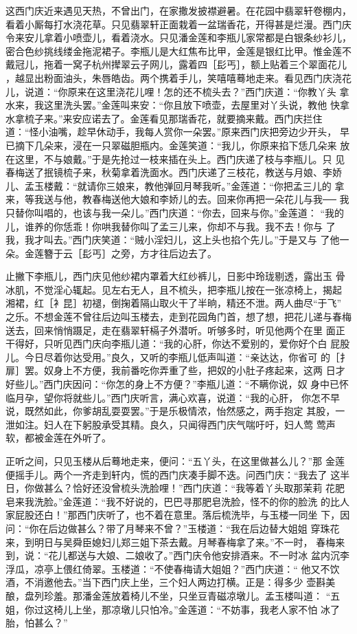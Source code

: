 这西门庆近来遇见天热，不曾出门，在家撒发披襟避暑。在花园中翡翠轩卷棚内，
看着小厮每打水浇花草。只见翡翠轩正面栽着一盆瑞香花，开得甚是烂漫。西门庆
令来安儿拿着小喷壶儿，看着浇水。只见潘金莲和李瓶儿家常都是白银条纱衫儿，
密合色纱挑线缕金拖泥裙子。李瓶儿是大红焦布比甲，金莲是银红比甲。惟金莲不
戴冠儿，拖着一窝子杭州撵翠云子网儿，露着四［髟丐］，额上贴着三个翠面花儿
，越显出粉面油头，朱唇皓齿。两个携着手儿，笑嘻嘻蓦地走来。看见西门庆浇花
儿，说道：“你原来在这里浇花儿哩！怎的还不梳头去？”西门庆道：“你教丫头
拿水来，我这里洗头罢。”金莲叫来安：“你且放下喷壶，去屋里对丫头说，教他
快拿水拿梳子来。”来安应诺去了。金莲看见那瑞香花，就要摘来戴。西门庆拦住
道：“怪小油嘴，趁早休动手，我每人赏你一朵罢。”原来西门庆把旁边少开头，
早已摘下几朵来，浸在一只翠磁胆瓶内。金莲笑道：“我儿，你原来掐下恁几朵来
放在这里，不与娘戴。”于是先抢过一枝来插在头上。西门庆递了枝与李瓶儿。只
见春梅送了抿镜梳子来，秋菊拿着洗面水。西门庆递了三枝花，教送与月娘、李娇
儿、孟玉楼戴：“就请你三娘来，教他弹回月琴我听。”金莲道：“你把孟三儿的
拿来，等我送与他，教春梅送他大娘和李娇儿的去。回来你再把一朵花儿与我──
我只替你叫唱的，也该与我一朵儿。”西门庆道：“你去，回来与你。”金莲道：
“我的儿，谁养的你恁乖！你哄我替你叫了孟三儿来，你却不与我。我不去！你与
了我，我才叫去。”西门庆笑道：“贼小淫妇儿，这上头也掐个先儿。”于是又与
了他一朵。金莲簪于云［髟丐］之旁，方才往后边去了。

止撇下李瓶儿，西门庆见他纱裙内罩着大红纱裤儿，日影中玲珑剔透，露出玉
骨冰肌，不觉淫心辄起。见左右无人，且不梳头，把李瓶儿按在一张凉椅上，揭起
湘裙，红［衤昆］初褪，倒掬着隔山取火干了半晌，精还不泄。两人曲尽“于飞”
之乐。不想金莲不曾往后边叫玉楼去，走到花园角门首，想了想，把花儿递与春梅
送去，回来悄悄蹑足，走在翡翠轩槅子外潜听。听够多时，听见他两个在里
面正干得好，只听见西门庆向李瓶儿道：“我的心肝，你达不爱别的，爱你好个白
屁股儿。今日尽着你达受用。”良久，又听的李瓶儿低声叫道：“亲达达，你省可
的［扌扉］罢。奴身上不方便，我前番吃你弄重了些，把奴的小肚子疼起来，这两
日才好些儿。”西门庆因问：“你怎的身上不方便？”李瓶儿道：“不瞒你说，奴
身中已怀临月孕，望你将就些儿。”西门庆听言，满心欢喜，说道：“我的心肝，
你怎不早说，既然如此，你爹胡乱耍耍罢。”于是乐极情浓，怡然感之，两手抱定
其股，一泄如注。妇人在下躬股承受其精。良久，只闻得西门庆气喘吁吁，妇人莺
莺声软，都被金莲在外听了。

正听之间，只见玉楼从后蓦地走来，便问：“五丫头，在这里做甚么儿？”那
金莲便摇手儿。两个一齐走到轩内，慌的西门庆凑手脚不迭。问西门庆：“我去了
这半日，你做甚么？恰好还没曾梳头洗脸哩！”西门庆道：“我等着丫头取那茉莉
花肥皂来我洗脸。”金莲道：“我不好说的，巴巴寻那肥皂洗脸，怪不的你的脸洗
的比人家屁股还白！”那西门庆听了，也不着在意里。落后梳洗毕，与玉楼一同坐
下，因问：“你在后边做甚么？带了月琴来不曾？”玉楼道：“我在后边替大姐姐
穿珠花来，到明日与吴舜臣媳妇儿郑三姐下茶去戴。月琴春梅拿了来。”不一时，
春梅来到，说：“花儿都送与大娘、二娘收了。”西门庆令他安排酒来。不一时冰
盆内沉李浮瓜，凉亭上偎红倚翠。玉楼道：“不使春梅请大姐姐？”西门庆道：“
他又不饮酒，不消邀他去。”当下西门庆上坐，三个妇人两边打横。正是：得多少
壶斟美酿，盘列珍羞。那潘金莲放着椅儿不坐，只坐豆青磁凉墩儿。孟玉楼叫道：
“五姐，你过这椅儿上坐，那凉墩儿只怕冷。”金莲道：“不妨事，我老人家不怕
冰了胎，怕甚么？”

